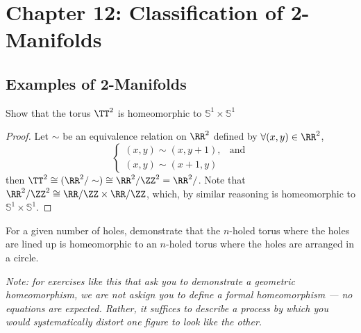 \chapter{Chapter 12: Classification of 2-Manifolds}

\section{Examples of 2-Manifolds}
\begin{problem}[12.1]
  Show that the torus $\TT^2$ is homeomorphic to $\mathbb{S}^1 \times
  \mathbb{S}^1$
\end{problem}
\begin{proof}
  Let $\sim$ be an equivalence relation on $\RR^2$ defined by $\forall (x,y) \in
  \RR^2$,
  \[
    \begin{cases}
      (x,y) \sim (x,y+1), & \text{and} \\
      (x,y) \sim (x+1, y)
    \end{cases}
  \]
  then $\TT^2 \cong (\RR^2 / \sim) \cong \RR^2 / \ZZ^2 = \RR^2 / $. Note that
  $\RR^2/\ZZ^2 \cong \RR/\ZZ \times \RR/\ZZ$, which, by similar reasoning is
  homeomorphic to $\mathbb{S}^1 \times \mathbb{S}^1$.
\end{proof}
\begin{problem}[12.2]
  For a given number of holes, demonstrate that the $n$-holed torus where the
  holes are lined up is homeomorphic to an $n$-holed torus where the holes are
  arranged in a circle.

  \emph{Note: for exercises like this that ask you to demonstrate a geometric
    homeomorphism, we are not askign you to define a formal homeomorphism --- no
    equations are expected. Rather, it suffices to describe a process by which
    you would systematically distort one figure to look like the other.}
\end{problem}

